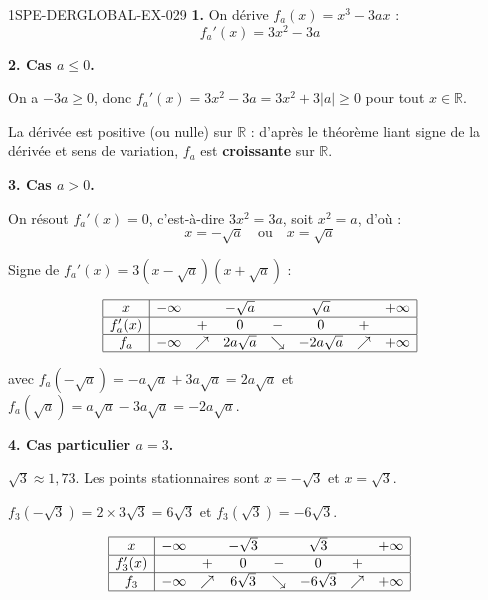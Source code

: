 \begin{corrige}{1SPE-DERGLOBAL-EX-029}
\textbf{1.} On dérive $f_a(x) = x^3 - 3ax$ :
\[
f_a'(x) = 3x^2 - 3a
\]

\textbf{2. Cas $a \leqslant 0$.}

On a $-3a \geqslant 0$, donc $f_a'(x) = 3x^2 - 3a = 3x^2 + 3|a| \geqslant 0$ pour tout $x \in \mathbb{R}$.

La dérivée est positive (ou nulle) sur $\mathbb{R}$ : d'après le théorème liant signe de la dérivée et sens de variation, $f_a$ est \textbf{croissante} sur $\mathbb{R}$.

\textbf{3. Cas $a > 0$.}

On résout $f_a'(x) = 0$, c'est-à-dire $3x^2 = 3a$, soit $x^2 = a$, d'où :
\[
x = -\sqrt{a} \quad \text{ou} \quad x = \sqrt{a}
\]

Signe de $f_a'(x) = 3(x - \sqrt{a})(x + \sqrt{a})$ :

\[
\begin{array}{|c|ccccccc|}
\hline
x & -\infty & & -\sqrt{a} & & \sqrt{a} & & +\infty \\
\hline
f_a'(x) & & + & 0 & - & 0 & + & \\
\hline
f_a & -\infty & \nearrow & 2a\sqrt{a} & \searrow & -2a\sqrt{a} & \nearrow & +\infty \\
\hline
\end{array}
\]

avec $f_a(-\sqrt{a}) = -a\sqrt{a} + 3a\sqrt{a} = 2a\sqrt{a}$ et $f_a(\sqrt{a}) = a\sqrt{a} - 3a\sqrt{a} = -2a\sqrt{a}$.

\textbf{4. Cas particulier $a = 3$.}

$\sqrt{3} \approx 1{,}73$. Les points stationnaires sont $x = -\sqrt{3}$ et $x = \sqrt{3}$.

$f_3(-\sqrt{3}) = 2 \times 3\sqrt{3} = 6\sqrt{3}$ et $f_3(\sqrt{3}) = -6\sqrt{3}$.

\[
\begin{array}{|c|ccccccc|}
\hline
x & -\infty & & -\sqrt{3} & & \sqrt{3} & & +\infty \\
\hline
f_3'(x) & & + & 0 & - & 0 & + & \\
\hline
f_3 & -\infty & \nearrow & 6\sqrt{3} & \searrow & -6\sqrt{3} & \nearrow & +\infty \\
\hline
\end{array}
\]
\end{corrige}
